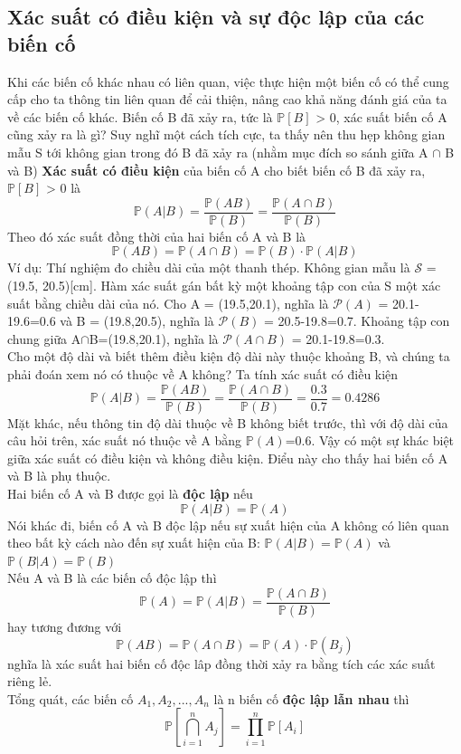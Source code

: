 \documentclass[a4paper, 13pt]{report}
\begin{document}
\subsection*{Xác suất có điều kiện và sự độc lập của các biến cố}
Khi các biến cố khác nhau có liên quan, việc thực hiện một biến cố có thể cung cấp cho ta thông tin liên quan để cải thiện, nâng cao khả năng đánh giá của ta về các biến cố khác. Biến cố B đã xảy ra, tức là $\mathbb{P}[B]$ > 0, xác suất biến cố A cũng xảy ra là gì? Suy nghĩ một cách tích cực, ta thấy nên thu hẹp không gian mẫu S tới không gian trong đó B đã xảy ra (nhằm mục đích so sánh giữa A $\cap$ B và B)
\textbf{Xác suất có điều kiện} của biến cố A cho biết biến cố B đã xảy ra, $\mathbb{P}[B]$ > 0 là
\[
\mathbb{P}(A|B)=\frac{\mathbb{P}(AB)}{\mathbb{P}(B)}=\frac{\mathbb{P}(A\cap B)}{\mathbb{P}(B)}
\]
Theo đó xác suất đồng thời của hai biến cố A và B là
\[
\mathbb{P}(AB)=\mathbb{P}(A\cap B)=\mathbb{P}(B)\cdot \mathbb{P}(A|B)
\]
Ví dụ: Thí nghiệm đo chiều dài của một thanh thép. Không gian mẫu là $\mathcal{S}$ = (19.5, 20.5)[cm]. Hàm xác suất gán bất kỳ một khoảng tập con của S một xác suất bằng chiều dài của nó. Cho A = (19.5,20.1), nghĩa là $\mathcal{P}(A)$ = 20.1-19.6=0.6 và B = (19.8,20.5), nghĩa là $\mathcal{P}(B)$ = 20.5-19.8=0.7. Khoảng tập con chung giữa A$\cap$B=(19.8,20.1), nghĩa là $\mathcal{P}(A\cap B)$ = 20.1-19.8=0.3.\\
Cho một độ dài và biết thêm điều kiện độ dài này thuộc khoảng B, và chúng ta phải đoán xem nó có thuộc về A không? Ta tính xác suất có điều kiện
\[
\mathbb{P}(A|B)=\frac{\mathbb{P}(AB)}{\mathbb{P}(B)}=\frac{\mathbb{P}(A\cap B)}{\mathbb{P}(B)}=\frac{0.3}{0.7}=0.4286
\]
Mặt khác, nếu thông tin độ dài thuộc về B không biết trước, thì với độ dài của câu hỏi trên, xác suất nó thuộc về A bằng $\mathbb{P}(A)$=0.6. Vậy có một sự khác biệt giữa xác suất có điều kiện và không điều kiện. Điểu này cho thấy hai biến cố A và B là phụ thuộc.\\
Hai biến cố A và B được gọi là \textbf{độc lập} nếu
\[
\mathbb{P}(A|B)=\mathbb{P}(A)
\]
Nói khác đi, biến cố A và B độc lập nếu sự xuất hiện của A không có liên quan theo bất kỳ cách nào đến sự xuất hiện của B: $\mathbb{P}(A|B)=\mathbb{P}(A)$ và $\mathbb{P}(B|A)=\mathbb{P}(B)$\\
Nếu A và B là các biến cố độc lập thì 
\[
\mathbb{P}(A)=\mathbb{P}(A|B)=\frac{\mathbb{P}(A\cap B)}{\mathbb{P}(B)}
\]
hay tương đương với 
\[
\mathbb{P}(AB)=\mathbb{P}(A\cap B)=\mathbb{P}(A)\cdot\mathbb{P}(B_j)
\]
nghĩa là xác suất hai biến cố độc lâp đồng thời xảy ra bằng tích các xác suất riêng lẻ.\\
Tổng quát, các biến cố $A_{1}, A_{2},..., A_{n}$ là n biến cố \textbf{độc lập lẫn nhau} thì
\[
\mathbb{P}\left[\bigcap_{i=1}^n A_j \right] = \prod_{i=1}^n \mathbb{P}[A_i]
\]
\end{document}

